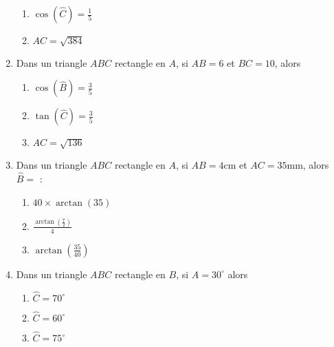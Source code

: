 \documentclass[oneside,twoside]{book}
\begin{document}
\begin{enumerate}
\begin{enumerate}
\item\MauvaiseReponse $\cos (\hat{C})=\frac{1}{5}$

\item\BonneReponse $AC=\sqrt{384}$

\end{enumerate}



\item Dans un triangle $ABC$ rectangle en $A$, si $AB=6$ et $BC=10$, alors

\begin{enumerate}

\item\BonneReponse $\cos (\hat{B})=\frac{3}{5}$

\item\MauvaiseReponse $\tan (\hat{C})=\frac{3}{5}$

\item\MauvaiseReponse $AC=\sqrt{136}$


\end{enumerate}



\item Dans un triangle $ABC$ rectangle en $A$, si $AB=4\mathrm{cm}$ et $AC=35\mathrm{mm}$, alors $\hat{B}=$ :

\begin{enumerate}

\item\MauvaiseReponse $40\times\arctan\left(35\right)$


\item\MauvaiseReponse $\frac{\arctan\left(\frac{7}{2}\right)}{4}$

\item\BonneReponse $\arctan\left(\frac{35}{40}\right)$

\end{enumerate}



\item Dans un triangle $ABC$ rectangle en $B$, si $\widehat{A}=30^{\circ}$ alors

\begin{enumerate}

\item\MauvaiseReponse $\widehat{C}=70^{\circ}$

\item\BonneReponse $\widehat{C}=60^{\circ}$

\item\MauvaiseReponse $\widehat{C}=75^{\circ}$



\end{enumerate}
\end{enumerate}
\end{document}
